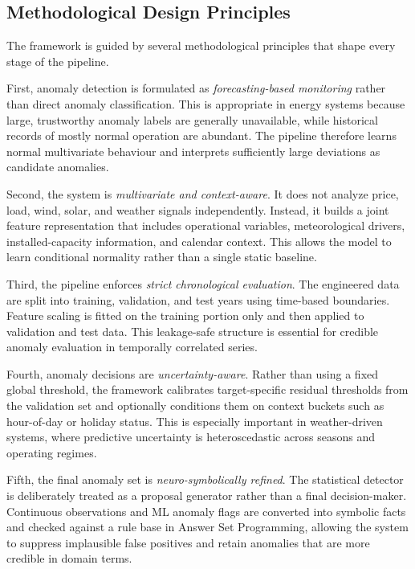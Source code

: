 \subsection{Methodological Design Principles}

The framework is guided by several methodological principles that shape every stage of the pipeline.

First, anomaly detection is formulated as \emph{forecasting-based monitoring} rather than direct anomaly classification. This is appropriate in energy systems because large, trustworthy anomaly labels are generally unavailable, while historical records of mostly normal operation are abundant. The pipeline therefore learns normal multivariate behaviour and interprets sufficiently large deviations as candidate anomalies.

Second, the system is \emph{multivariate and context-aware}. It does not analyze price, load, wind, solar, and weather signals independently. Instead, it builds a joint feature representation that includes operational variables, meteorological drivers, installed-capacity information, and calendar context. This allows the model to learn conditional normality rather than a single static baseline.

Third, the pipeline enforces \emph{strict chronological evaluation}. The engineered data are split into training, validation, and test years using time-based boundaries. Feature scaling is fitted on the training portion only and then applied to validation and test data. This leakage-safe structure is essential for credible anomaly evaluation in temporally correlated series.

Fourth, anomaly decisions are \emph{uncertainty-aware}. Rather than using a fixed global threshold, the framework calibrates target-specific residual thresholds from the validation set and optionally conditions them on context buckets such as hour-of-day or holiday status. This is especially important in weather-driven systems, where predictive uncertainty is heteroscedastic across seasons and operating regimes.

Fifth, the final anomaly set is \emph{neuro-symbolically refined}. The statistical detector is deliberately treated as a proposal generator rather than a final decision-maker. Continuous observations and ML anomaly flags are converted into symbolic facts and checked against a rule base in Answer Set Programming, allowing the system to suppress implausible false positives and retain anomalies that are more credible in domain terms.

